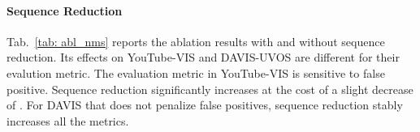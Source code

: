 \documentclass[10pt,twocolumn,letterpaper]{article}
\begin{document}
	\vspace{-0.15in}
	\paragraph{Sequence Reduction}
	Tab.~\ref{tab: abl_nms} reports the ablation results with and without sequence reduction. Its effects on YouTube-VIS and DAVIS-UVOS are different for their evalution metric. The evaluation metric in YouTube-VIS is sensitive to false positive. Sequence reduction significantly increases  at the cost of a slight decrease of . For DAVIS that does not penalize false positives, sequence reduction stably increases all the metrics.
	
	
	\begin{table}[t]
		\centering
		\vspace{0.05in}
		\caption{Sequence reduction analysis on YouTube-VIS and DAVIS-UVOS validation set. } 
		\label{tab: abl_nms}
		\vspace{-0.1in}
	\end{table}
	

	\begin{table}[t]
		\centering
		\vspace{0.05in}
		\caption{Ablations of Category-Aware Reduction (CA. Reduce) on different backbones. We reports  for YouTube-VIS. } 
		\label{tab: abl_ca_reduce}
		\vspace{-0.2in}
	\end{table}
\end{document}
